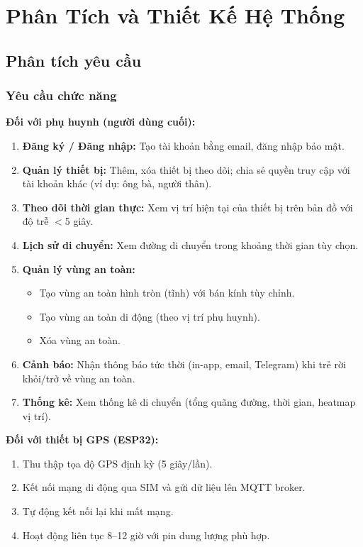 \chapter{Phân Tích và Thiết Kế Hệ Thống}

\section{Phân tích yêu cầu}

\subsection{Yêu cầu chức năng}

\textbf{Đối với phụ huynh (người dùng cuối):}

\begin{enumerate}
  \item \textbf{Đăng ký / Đăng nhập:} Tạo tài khoản bằng email, đăng nhập bảo mật.
  \item \textbf{Quản lý thiết bị:} Thêm, xóa thiết bị theo dõi; chia sẻ quyền truy cập với tài khoản khác (ví dụ: ông bà, người thân).
  \item \textbf{Theo dõi thời gian thực:} Xem vị trí hiện tại của thiết bị trên bản đồ với độ trễ $<$5 giây.
  \item \textbf{Lịch sử di chuyển:} Xem đường di chuyển trong khoảng thời gian tùy chọn.
  \item \textbf{Quản lý vùng an toàn:}
    \begin{itemize}[noitemsep]
      \item Tạo vùng an toàn hình tròn (tĩnh) với bán kính tùy chỉnh.
      \item Tạo vùng an toàn di động (theo vị trí phụ huynh).
      \item Xóa vùng an toàn.
    \end{itemize}
  \item \textbf{Cảnh báo:} Nhận thông báo tức thời (in-app, email, Telegram) khi trẻ rời khỏi/trở về vùng an toàn.
  \item \textbf{Thống kê:} Xem thống kê di chuyển (tổng quãng đường, thời gian, heatmap vị trí).
\end{enumerate}

\textbf{Đối với thiết bị GPS (ESP32):}

\begin{enumerate}
  \item Thu thập tọa độ GPS định kỳ (5 giây/lần).
  \item Kết nối mạng di động qua SIM và gửi dữ liệu lên MQTT broker.
  \item Tự động kết nối lại khi mất mạng.
  \item Hoạt động liên tục 8--12 giờ với pin dung lượng phù hợp.
\end{enumerate}

